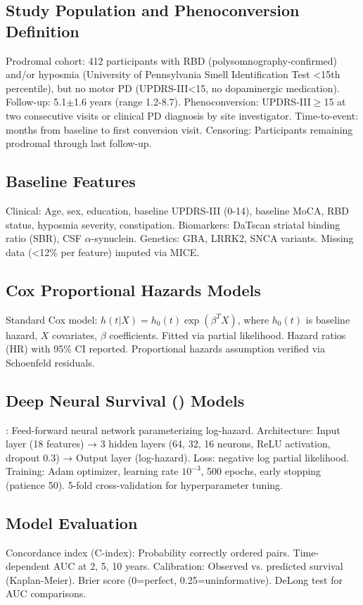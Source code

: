 \subsection{Study Population and Phenoconversion Definition}
Prodromal cohort: 412 \ppmi{} participants with RBD (polysomnography-confirmed) and/or hyposmia (University of Pennsylvania Smell Identification Test <15th percentile), but no motor PD (UPDRS-III<15, no dopaminergic medication). Follow-up: 5.1$\pm$1.6 years (range 1.2-8.7). Phenoconversion: UPDRS-III$\geq$15 at two consecutive visits or clinical PD diagnosis by site investigator. Time-to-event: months from baseline to first conversion visit. Censoring: Participants remaining prodromal through last follow-up.

\subsection{Baseline Features}
Clinical: Age, sex, education, baseline UPDRS-III (0-14), baseline MoCA, RBD status, hyposmia severity, constipation. Biomarkers: DaTscan striatal binding ratio (SBR), CSF $\alpha$-synuclein. Genetics: GBA, LRRK2, SNCA variants. Missing data (<12\% per feature) imputed via MICE.

\subsection{Cox Proportional Hazards Models}
Standard Cox model\cite{cox1972regression}: $h(t|X) = h_0(t) \exp(\beta^T X)$, where $h_0(t)$ is baseline hazard, $X$ covariates, $\beta$ coefficients. Fitted via partial likelihood. Hazard ratios (HR) with 95\% CI reported. Proportional hazards assumption verified via Schoenfeld residuals.

\subsection{Deep Neural Survival (\deepsurv) Models}
\deepsurv\cite{katzman2018deepsurv}: Feed-forward neural network parameterizing log-hazard. Architecture: Input layer (18 features) → 3 hidden layers (64, 32, 16 neurons, ReLU activation, dropout 0.3) → Output layer (log-hazard). Loss: negative log partial likelihood. Training: Adam optimizer, learning rate $10^{-3}$, 500 epochs, early stopping (patience 50). 5-fold cross-validation for hyperparameter tuning.

\subsection{Model Evaluation}
Concordance index (C-index): Probability correctly ordered pairs. Time-dependent AUC at 2, 5, 10 years. Calibration: Observed vs. predicted survival (Kaplan-Meier). Brier score (0=perfect, 0.25=uninformative). DeLong test for AUC comparisons.

